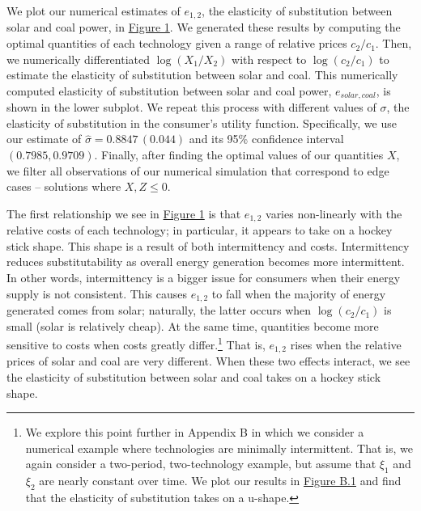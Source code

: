 \documentclass[11pt,a4paper]{extarticle}
\begin{document}
We plot our numerical estimates of $e_{1, 2}$, the elasticity of substitution between solar and coal power, in \hyperref[fig:eosnum]{Figure 1}. We generated these results by computing the optimal quantities of each technology given a range of relative prices $c_2/c_1$. Then, we numerically differentiated $\log(X_1/X_2)$ with respect to $\log(c_2/c_1)$ to estimate the elasticity of substitution between solar and coal. This numerically computed elasticity of substitution between solar and coal power, $e_{solar,coal}$, is shown in the lower subplot. We repeat this process with different values of $\sigma$, the elasticity of substitution in the consumer's utility function. Specifically, we use our estimate of $\hat{\sigma} = 0.8847\, (0.044)$ and its 95\%  confidence interval $(0.7985, 0.9709)$.  Finally, after finding the optimal values of our quantities $X$, we filter all observations of our numerical simulation that correspond to edge cases -- solutions where $X, Z \leq  0$.



The first relationship we see in \hyperref[fig:eosnum]{Figure 1} is that $e_{1,2}$ varies non-linearly with the relative costs of each technology; in particular, it appears to take on a hockey stick shape. This shape is a result of both intermittency and costs. Intermittency reduces substitutability as overall energy generation becomes more intermittent. In other words, intermittency is a bigger issue for consumers when their energy supply is not consistent. This causes $e_{1,2}$ to fall when the majority of energy generated comes from solar; naturally, the latter occurs when $\log(c_2/c_1)$ is small (solar is relatively cheap). At the same time, quantities become more sensitive to costs when costs greatly differ.\footnote{We explore this point further in Appendix B in which we consider a numerical example where technologies are minimally intermittent. That is, we again consider a two-period, two-technology example, but assume that $\xi_1$ and $\xi_2$ are nearly constant over time. We plot our results in \hyperref[fig:eosrange]{Figure B.1} and find that the elasticity of substitution takes on a u-shape. } That is, $e_{1,2}$ rises when the relative prices of solar and coal are very different. When these two effects interact, we see the elasticity of substitution between solar and coal takes on a hockey stick shape. 
\end{document}
